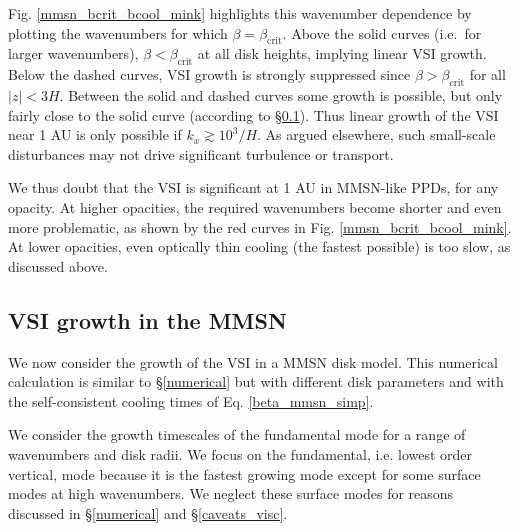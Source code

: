 Fig. \ref{mmsn_bcrit_bcool_mink} highlights this wavenumber dependence by plotting
the wavenumbers for which $\beta = \beta_\mathrm{crit}$.  Above the
solid curves (i.e.\ for larger wavenumbers), $\beta <
\beta_\mathrm{crit}$ at all disk heights, implying linear VSI growth.
Below the dashed curves, VSI growth is strongly suppressed since
$\beta >  \beta_\mathrm{crit}$ for all $|z| < 3H$.  Between the solid
and dashed curves some growth is possible, but only fairly close to
the solid curve (according to \S\ref{vsi_mmsn_grow}).  Thus linear
growth of the VSI near 1 AU is only possible if $k_x \gtrsim 10^3/H$.
As argued elsewhere, such small-scale disturbances may not 
drive significant turbulence or transport. 

We thus doubt that the VSI is significant at 1 AU in MMSN-like PPDs,
for any opacity.  At higher opacities, the required wavenumbers become
shorter and even more problematic, as shown by the red curves in
Fig. \ref{mmsn_bcrit_bcool_mink}.  At lower opacities, even optically
thin cooling (the fastest possible) is too slow, as discussed above.  




\subsection{VSI growth in the MMSN}\label{vsi_mmsn_grow}
We now consider the growth of the VSI in a MMSN disk model.  This numerical calculation is similar to   
\S\ref{numerical} but with different disk parameters and with the
self-consistent cooling times of  Eq. \ref{beta_mmsn_simp}. 

We consider the growth timescales of the fundamental mode for a range of
wavenumbers and disk radii. We focus on the fundamental, i.e. lowest order vertical, mode 
because it is the fastest growing mode except for some surface modes at high 
wavenumbers. We neglect these surface modes for reasons discussed in
\S\ref{numerical} and \S\ref{caveats_visc}. 


